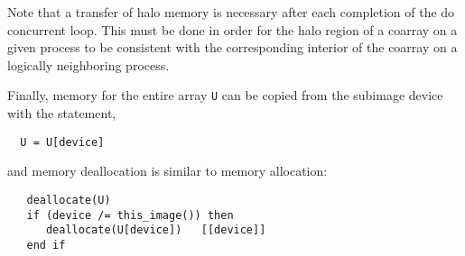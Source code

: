 Note that a transfer of halo memory is necessary after each completion of the do concurrent loop.
This must be done in order for the halo region of a coarray on a given process to be consistent
with the corresponding interior of the coarray on a logically neighboring process.


Finally, memory for the entire array \texttt{U} can be copied from the
subimage device with the statement,

\begin{verbatim}
  U = U[device]
\end{verbatim}
and memory deallocation is similar to memory allocation:

\begin{verbatim}
   deallocate(U)
   if (device /= this_image()) then
      deallocate(U[device])   [[device]]
   end if
\end{verbatim}










